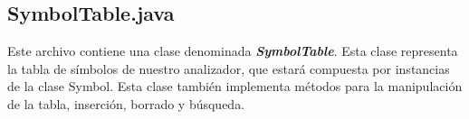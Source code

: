       \subsection{SymbolTable.java}
      Este archivo contiene una clase denominada \textbf{\textit{SymbolTable}}. Esta clase representa la tabla de símbolos de nuestro 
      analizador, que estará compuesta por instancias de la clase Symbol. Esta clase también implementa métodos para la manipulación de
      la tabla, inserción, borrado y búsqueda. 

